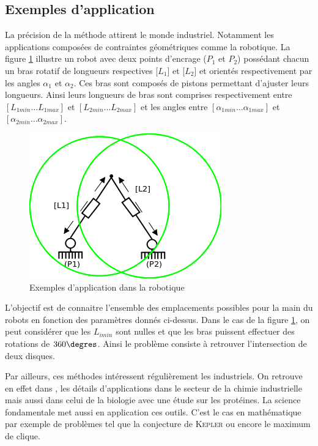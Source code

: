 \subsection{Exemples d'application}

La précision de la méthode attirent le monde industriel. Notamment les applications composées de contraintes géométriques comme la robotique. La figure \ref{fig:rob} illustre un robot avec deux points d'encrage ($P_1$ et $P_2$) possédant chacun un bras rotatif de longueurs respectives [$L_1$] et [$L_2$] et orientés respectivement par les angles $\alpha_1$ et $\alpha_2$. Ces bras sont composés de pistons permettant d'ajuster leurs longueurs. Ainsi leurs longueurs de bras sont comprises respectivement entre $[L_{1min} \dots L_{1max}]$ et $[L_{2min} \dots L_{2max}]$ et les angles entre $[\alpha_{1min} \dots \alpha_{1max}]$ et $[\alpha_{2min} \dots \alpha_{2max}]$.  

\begin{figure}[h] %
  \center
\includegraphics[scale=0.80]{img/robot2}
  \caption{Exemples d'application dans la robotique} %
 \label{fig:rob} %
\end{figure} %
L'objectif est de connaitre l'ensemble des emplacements possibles pour la main du robots en fonction des paramètres donnés ci-dessus. Dans le cas de la figure \ref{fig:rob}, on peut considérer que les $L_{imin}$ sont nulles et que les bras puissent effectuer des rotations de $360 \degres$. Ainsi le problème consiste à retrouver l'intersection de deux disques. 

  Par ailleurs, ces méthodes intéressent régulièrement les industriels. On retrouve en effet dans \cite{Schichl}, les détails d'applications dans le secteur de la chimie industrielle mais aussi dans celui de la biologie avec une étude sur les protéines. La science fondamentale met aussi en application ces outils. C'est le cas en mathématique par exemple de problèmes tel que la conjecture de \textsc{Kepler} ou encore le  maximum de clique.

\clearpage
